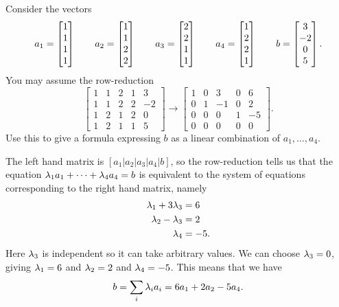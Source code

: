 \documentclass[a4paper]{amsart}
\renewenvironment{solution}{\SolutionInline}{\endSolutionInline}
\begin{document}
\begin{exercise}\label{ex-combination-iii}
 Consider the vectors
 \[
  a_1 = \left[\begin{matrix} 1 \\  1 \\ 1 \\ 1 \end{matrix}\right] \qquad
  a_2 = \left[\begin{matrix} 1 \\  1 \\ 2 \\ 2 \end{matrix}\right] \qquad
  a_3 = \left[\begin{matrix} 2 \\  2 \\ 1 \\ 1 \end{matrix}\right] \qquad
  a_4 = \left[\begin{matrix} 1 \\  2 \\ 2 \\ 1 \end{matrix}\right] \qquad
  b   = \left[\begin{matrix} 3 \\ -2 \\ 0 \\ 5 \end{matrix}\right].
 \]
 You may assume the row-reduction
 \[ 
  \left[\begin{array}{cccc|c}
   1 & 1 & 2 & 1 &  3 \\
   1 & 1 & 2 & 2 & -2 \\
   1 & 2 & 1 & 2 &  0 \\
   1 & 2 & 1 & 1 &  5
  \end{array}\right]
  \to 
  \left[\begin{array}{cccc|c}
   1 & 0 &  3 & 0 &  6 \\
   0 & 1 & -1 & 0 &  2 \\
   0 & 0 &  0 & 1 & -5 \\
   0 & 0 &  0 & 0 &  0 
  \end{array}\right].
 \]
 Use this to give a formula expressing $b$ as a linear combination of
 $a_1,\dotsc,a_4$. 
\end{exercise}
\begin{solution}
 The left hand matrix is $[a_1|a_2|a_3|a_4|b]$, so the row-reduction
 tells us that the equation $\lambda_1a_1+\dotsb+\lambda_4a_4=b$ is equivalent
 to the system of equations corresponding to the right hand matrix,
 namely 
 \begin{align*}
  \lambda_1+3\lambda_3 &= 6 \\
  \lambda_2-\lambda_3  &= 2 \\
  \lambda_4        &= -5.
 \end{align*}
 Here $\lambda_3$ is independent so it can take arbitrary values.  We can
 choose $\lambda_3=0$, giving $\lambda_1=6$ and $\lambda_2=2$ and $\lambda_4=-5$.
 This means that we have
 \[ b = \sum_i\lambda_ia_i = 6a_1+2a_2-5a_4. \]
\end{solution}
\end{document}
